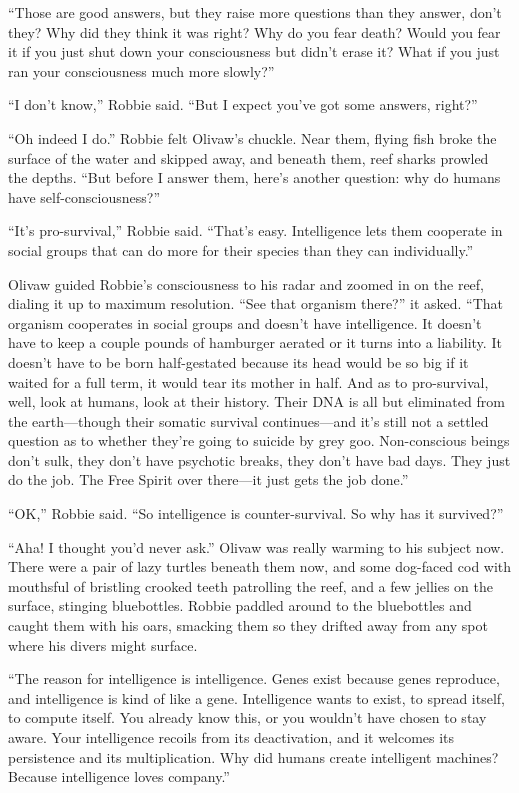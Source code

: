 “Those are good answers, but they raise more questions than they
answer, don’t they? Why did they think it was right? Why do you
fear death? Would you fear it if you just shut down your
consciousness but didn’t erase it? What if you just ran your
consciousness much more slowly?”

“I don’t know,” Robbie said. “But I expect you’ve got some answers,
right?”

“Oh indeed I do.” Robbie felt Olivaw’s chuckle. Near them, flying
fish broke the surface of the water and skipped away, and beneath
them, reef sharks prowled the depths. “But before I answer them,
here’s another question: why do humans have self-consciousness?”

“It’s pro-survival,” Robbie said. “That’s easy. Intelligence lets
them cooperate in social groups that can do more for their species
than they can individually.”

Olivaw guided Robbie’s consciousness to his radar and zoomed in on
the reef, dialing it up to maximum resolution. “See that organism
there?” it asked. “That organism cooperates in social groups and
doesn’t have intelligence. It doesn’t have to keep a couple pounds
of hamburger aerated or it turns into a liability. It doesn’t have
to be born half-gestated because its head would be so big if it
waited for a full term, it would tear its mother in half. And as to
pro-survival, well, look at humans, look at their history. Their
DNA is all but eliminated from the earth—though their somatic
survival continues—and it’s still not a settled question as to
whether they’re going to suicide by grey goo. Non-conscious beings
don’t sulk, they don’t have psychotic breaks, they don’t have bad
days. They just do the job. The Free Spirit over there—it just gets
the job done.”

“OK,” Robbie said. “So intelligence is counter-survival. So why has
it survived?”

“Aha! I thought you’d never ask.” Olivaw was really warming to his
subject now. There were a pair of lazy turtles beneath them now,
and some dog-faced cod with mouthsful of bristling crooked teeth
patrolling the reef, and a few jellies on the surface, stinging
bluebottles. Robbie paddled around to the bluebottles and caught
them with his oars, smacking them so they drifted away from any
spot where his divers might surface.

“The reason for intelligence is intelligence. Genes exist because
genes reproduce, and intelligence is kind of like a gene.
Intelligence wants to exist, to spread itself, to compute itself.
You already know this, or you wouldn’t have chosen to stay aware.
Your intelligence recoils from its deactivation, and it welcomes
its persistence and its multiplication. Why did humans create
intelligent machines? Because intelligence loves company.”

